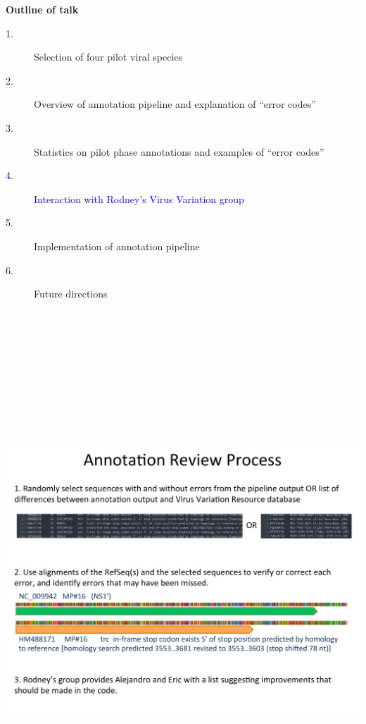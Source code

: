 \documentclass[landscape]{slides}
\begin{document}
\begin{slide}
\begin{center}
\textbf{Outline of talk}

\small
\begin{description}
\item[1.] Selection of four pilot viral species
\item[2.] Overview of annotation pipeline and explanation of ``error codes''
\item[3.] Statistics on pilot phase annotations and examples of ``error codes''
\item[\textcolor{blue}4.] \textcolor{blue}{Interaction with Rodney's Virus Variation group}
\item[5.] Implementation of annotation pipeline
\item[6.] Future directions
\end{description}

\end{center}
\vfill
\end{slide}
\begin{slide}
\begin{center}
\includegraphics[height=8in]{figs/eneida-slide-1}
\vfill
\end{center}
\end{slide}
\end{document}
